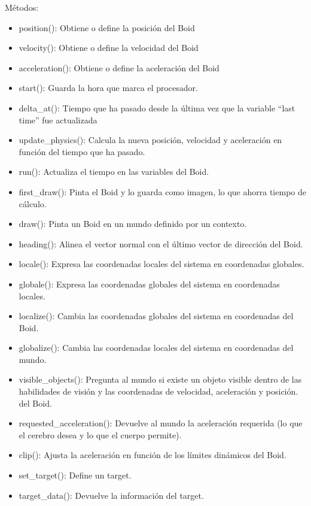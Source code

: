 Métodos:
\begin{itemize}
 \item position():
Obtiene o define la posición del Boid

  \item velocity():
Obtiene o define la velocidad del Boid

  \item acceleration():
Obtiene o define la aceleración del Boid

  \item start():
Guarda la hora que marca el procesador.

  \item delta\_at():
Tiempo que ha pasado desde la última vez que la variable “last time” fue actualizada

  \item update\_physics():
Calcula la nueva posición, velocidad y aceleración en función del tiempo que ha pasado.

  \item run():
Actualiza el tiempo en las variables del Boid.

  \item first\_draw():
Pinta el Boid y lo guarda como imagen, lo que ahorra tiempo de cálculo.

  \item draw():
Pinta un Boid en un mundo definido por un contexto.

  \item heading():
Alinea el vector normal con el último vector de dirección del Boid.

  \item locale():
Expresa las coordenadas locales del sistema en coordenadas globales.

  \item globale():
Expresa las coordenadas globales del sistema en coordenadas locales.

  \item localize():
Cambia las coordenadas globales del sistema en coordenadas del Boid.

  \item globalize():
Cambia las coordenadas locales del sistema en coordenadas del mundo.

  \item visible\_objects():  
Pregunta al mundo si existe un objeto visible dentro de las habilidades de visión y las coordenadas de velocidad, aceleración y posición.
del Boid.

  \item requested\_acceleration(): Devuelve al mundo la aceleración requerida (lo que el cerebro desea y lo que el cuerpo permite).

  \item clip():
Ajusta la aceleración en función de los límites dinámicos del Boid.

  \item set\_target():
Define un target.

  \item  target\_data():
Devuelve la información del target.
\end{itemize}




